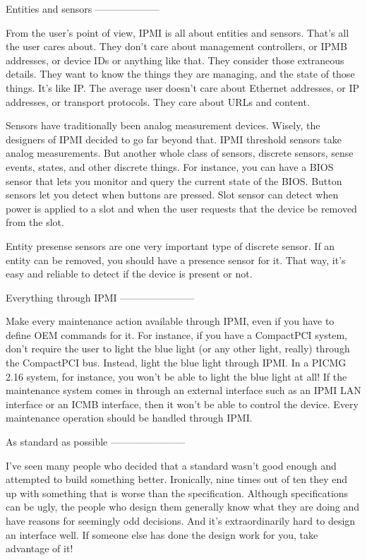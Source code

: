 Entities and sensors
--------------------

From the user's point of view, IPMI is all about entities and sensors.
That's all the user cares about.  They don't care about management
controllers, or IPMB addresses, or device IDs or anything like that.
They consider those extraneous details.  They want to know the things
they are managing, and the state of those things.  It's like IP.  The
average user doesn't care about Ethernet addresses, or IP addresses,
or transport protocols.  They care about URLs and content.

Sensors have traditionally been analog measurement devices.  Wisely,
the designers of IPMI decided to go far beyond that.  IPMI threshold
sensors take analog measurements.  But another whole class of sensors,
discrete sensors, sense events, states, and other discrete things.
For instance, you can have a BIOS sensor that lets you monitor and
query the current state of the BIOS.  Button sensors let you detect
when buttons are pressed.  Slot sensor can detect when power is
applied to a slot and when the user requests that the device be
removed from the slot.

Entity presense sensors are one very important type of discrete
sensor.  If an entity can be removed, you should have a presence
sensor for it.  That way, it's easy and reliable to detect if the
device is present or not.


Everything through IPMI
-----------------------

Make every maintenance action available through IPMI, even if you have
to define OEM commands for it.  For instance, if you have a CompactPCI
system, don't require the user to light the blue light (or any other
light, really) through the CompactPCI bus.  Instead, light the blue
light through IPMI.  In a PICMG 2.16 system, for instance, you won't
be able to light the blue light at all!  If the maintenance system
comes in through an external interface such as an IPMI LAN interface
or an ICMB interface, then it won't be able to control the device.
Every maintenance operation should be handled through IPMI.


As standard as possible
-----------------------

I've seen many people who decided that a standard wasn't good enough
and attempted to build something better.  Ironically, nine times out
of ten they end up with something that is worse than the
specification.  Although specifications can be ugly, the people who
design them generally know what they are doing and have reasons for
seemingly odd decisions.  And it's extraordinarily hard to design an
interface well.  If someone else has done the design work for you,
take advantage of it!

